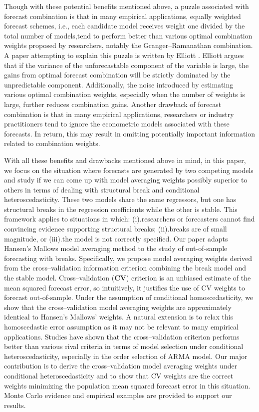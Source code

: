 Though with these potential benefits mentioned above, a puzzle associated with forecast combination is that in many empirical applications, equally weighted forecast schemes, i.e., each candidate model receives weight one divided by the total number of models,tend to perform better than various optimal combination weights proposed by researchers, notably the Granger--Ramanathan combination. A paper attempting to explain this puzzle is written by Elliott \cite{elliott11}. Elliott argues that if the variance of the unforecastable component of the variable is large, the gains from optimal forecast combination will be strictly dominated by the unpredictable component. Additionally, the noise introduced by estimating various optimal combination weights, especially when the number of weights is large, further reduces combination gains. Another drawback of forecast combination is that in many empirical applications, researchers or industry practitioners tend to ignore the econometric models associated with these forecasts. In return, this may result in omitting potentially important information related to combination weights.

With all these benefits and drawbacks mentioned above in mind, in this paper, we focus on the situation where forecasts are generated by two competing models and study if we can come up with model averaging weights possibly superior to others in terms of dealing with structural break and conditional heteroscedasticity. These two models share the same regressors, but one has structural breaks in the regression coefficients while the other is stable. This framework applies to situations in which: (i).researchers or forecasters cannot find convincing evidence supporting structural breaks; (ii).breaks are of small magnitude, or (iii).the model is not correctly specified. Our paper adapts Hansen's Mallows model averaging method \cite{hansen2009averaging} to the study of out-of-sample forecasting with breaks. Specifically, we propose model averaging weights derived from the cross--validation information criterion combining the break model and the stable model. Cross--validation (\textbf{CV}) criterion is an unbiased estimate of the mean squared forecast error, so intuitively, it justifies the use of CV weights to forecast out-of-sample. Under the assumption of conditional homoscedasticity, we show that the cross--validation model averaging weights are approximately identical to Hansen's Mallows' weights. A natural extension is to relax this homoscedastic error assumption as it may not be relevant to many empirical applications. Studies have shown that the cross--validation criterion performs better than various rival criteria in terms of model selection under conditional heteroscedasticity, especially in the order selection of ARMA model. Our major contribution is to derive the cross--validation model averaging weights under conditional heteroscedasticity and to show that CV weights are the correct weights minimizing the population mean squared forecast error in this situation. Monte Carlo evidence and empirical examples are provided to support our results.

